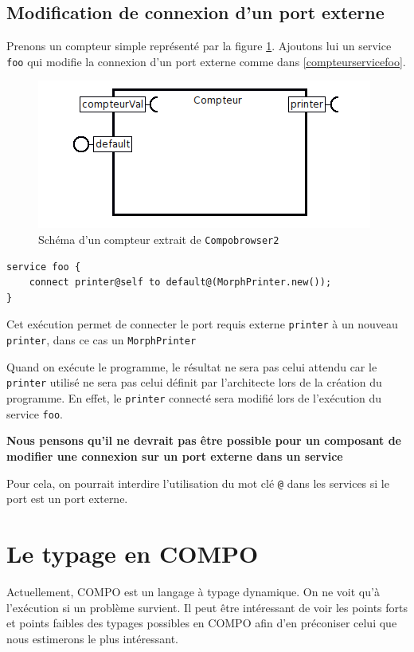 \documentclass[11pt,a4paper,openany,oneside]{book}
\begin{document}
\subsection{Modification de connexion d'un port externe}

Prenons un compteur simple représenté par la figure \ref{compteursimple}. Ajoutons lui un service \texttt{foo} qui modifie la connexion d'un port externe comme dans \ref{compteurservicefoo}.

\begin{figure}[H]
\centering
\includegraphics[scale=0.7, keepaspectratio=true]{compteursimple}
\caption{Schéma d'un compteur extrait de \texttt{Compobrowser2}}
\label{compteursimple}
\end{figure}

\begin{lstlisting}[language=Compo, frame=single, caption=Exemple d'un service dans un composant compteur,label=compteurservicefoo]
service foo {
    connect printer@self to default@(MorphPrinter.new());
}
\end{lstlisting}

Cet exécution permet de connecter le port requis externe \texttt{printer} à un nouveau \texttt{printer}, dans ce cas un \texttt{MorphPrinter}

Quand on exécute le programme, le résultat ne sera pas celui attendu car le \texttt{printer} utilisé ne sera pas celui définit par l'architecte lors de la création du programme. En effet, le \texttt{printer} connecté sera modifié lors de l'exécution du service \texttt{foo}.

\textbf{Nous pensons qu'il ne devrait pas être possible pour un composant de modifier une connexion sur un port externe dans un service}

Pour cela, on pourrait interdire l'utilisation du mot clé \texttt{@} dans les services si le port est un port externe.

\section{Le typage en COMPO}
Actuellement, COMPO est un langage à typage dynamique. On ne voit qu'à l'exécution si un problème survient. Il peut être intéressant de voir les points forts et points faibles des typages possibles en COMPO afin d'en préconiser celui que nous estimerons le plus intéressant.
\end{document}
